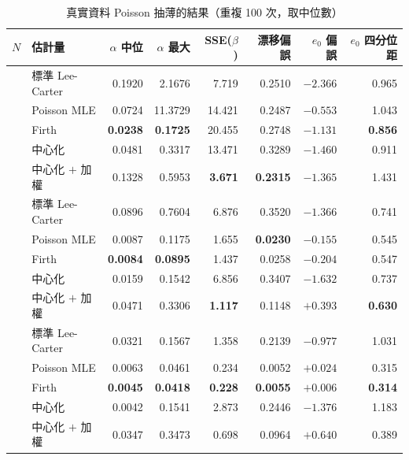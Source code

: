 \documentclass[UTF8, fontset=macnew, a4paper, 12pt]{ctexart}
\begin{document}
\begin{table}[H]
\centering
\caption{真實資料 Poisson 抽薄的結果（重複 100 次，取中位數）}
\small
\begin{tabular}{llrrrrrr}
\toprule
$N$ & 估計量 & $\alpha$ 中位 & $\alpha$ 最大 & SSE($\beta$) & 漂移偏誤 & $e_0$ 偏誤 & $e_0$ 四分位距\\
\midrule
{}
 & 標準 Lee-Carter          & 0.1920 & 2.1676 & 7.719 & 0.2510 & $-2.366$ & 0.965\\
 & Poisson MLE       & 0.0724 & 11.3729 & 14.421 & 0.2487 & \textbf{$-0.553$} & 1.043\\
 & Firth            & \textbf{0.0238} & \textbf{0.1725} & 20.455 & 0.2748 & $-1.131$ & \textbf{0.856}\\
 & 中心化           & 0.0481 & 0.3317 & 13.471 & 0.3289 & $-1.460$ & 0.911\\
 & 中心化 $+$ 加權   & 0.1328 & 0.5953 & \textbf{3.671} & \textbf{0.2315} & $-1.365$ & 1.431\\
\midrule
{}
 & 標準 Lee-Carter          & 0.0896 & 0.7604 & 6.876 & 0.3520 & $-1.366$ & 0.741\\
 & Poisson MLE       & 0.0087 & 0.1175 & 1.655 & \textbf{0.0230} & \textbf{$-0.155$} & 0.545\\
 & Firth            & \textbf{0.0084} & \textbf{0.0895} & 1.437 & 0.0258 & $-0.204$ & 0.547\\
 & 中心化           & 0.0159 & 0.1542 & 6.856 & 0.3407 & $-1.632$ & 0.737\\
 & 中心化 $+$ 加權   & 0.0471 & 0.3306 & \textbf{1.117} & 0.1148 & $+0.393$ & \textbf{0.630}\\
\midrule
{}
 & 標準 Lee-Carter          & 0.0321 & 0.1567 & 1.358 & 0.2139 & $-0.977$ & 1.031\\
 & Poisson MLE       & 0.0063 & 0.0461 & 0.234 & 0.0052 & $+0.024$ & 0.315\\
 & Firth            & \textbf{0.0045} & \textbf{0.0418} & \textbf{0.228} & \textbf{0.0055} & \textbf{$+0.006$} & \textbf{0.314}\\
 & 中心化           & 0.0042 & 0.1541 & 2.873 & 0.2446 & $-1.376$ & 1.183\\
 & 中心化 $+$ 加權   & 0.0347 & 0.3473 & 0.698 & 0.0964 & $+0.640$ & 0.389\\
\bottomrule
\end{tabular}
\label{tab:real}
\end{table}
\end{document}
